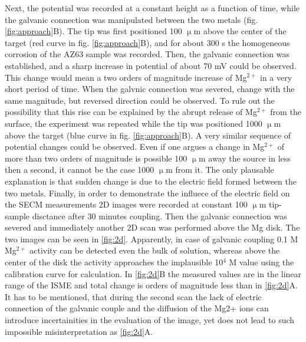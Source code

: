 \documentclass[3p]{elsarticle}
\begin{document}
Next, the potential was recorded at a constant height as a function of time, while the galvanic connection was manipulated between the two metals (fig. \ref{fig:approach}B). The tip was first positioned 100 $\upmu$m above the center of the target (red curve in fig. \ref{fig:approach}B), and for about 300 s the homogeneous corrosion of the AZ63 sample was recorded. Then, the galvanic connection was established, and a sharp increase in potential of about 70 mV could be observed. This change would mean a two orders of magnitude increase of Mg$^{2+}$ in a very short period of time. When the galvnic connection was severed, change with the same magnitude, but reversed direction could be observed. To rule out the possibility that this rise can be explained by the abrupt release of Mg$^{2+}$ from the surface, the experiment was repeated while the tip was positioned 1000 $\upmu$m above the target (blue curve in fig. \ref{fig:approach}B). A very similar sequence of potential changes could be observed. Even if one argues a change in Mg$^{2+}$ of more than two orders of magnitude is possible 100 $\upmu$m away the source in less then a second, it cannot be the case 1000 $\upmu$m from it. The only plausable explanation is that sudden change is due to the electric field formed between the two metals. 
Finally, in order to demonstrate the influece of the electric field on the SECM measurements 2D images were recorded at constant 100 $\upmu$m tip-sample disctance after 30 minutes coupling. 
Then the galvanic connection was severed and immediately another 2D scan was performed above the Mg disk. The two images can be seen in \ref{fig:2d}. Apparently, in case of galvanic coupling 0.1 M Mg$^{2+}$ activity can be detected even the bulk of solution, whereas above the center of the disk the activity approaches the implausible 10$^{4}$ M value using the calibration curve for calculation.   
In \ref{fig:2d}B the measured values are in the linear range of the ISME and total change is orders of magnitude less than in  \ref{fig:2d}A. It has to be mentioned, that during the second scan the lack of electric connection of the galvanic couple and the diffusion of the Mg2+ ions can introduce incertainities in the evaluation of the image, yet does not lead to such impossible misinterpretation as \ref{fig:2d}A.
\end{document}
